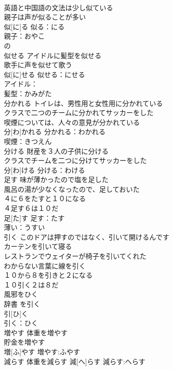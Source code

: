 \documentclass[8pt]{extreport}
\begin{document}
\begin{CJK}{UTF8}{min}
\\	英語と中国語の文法は少し似ている 
\\	親子は声が似ることが多い 
\\	似[に]る			似る：にる
\\	親子：おやこ
\\	の
\\	似せる	アイドルに髪型を似せる 
\\	歌手に声を似せて歌う 
\\	似[に]せる			似せる：にせる
\\	アイドル：
\\	髪型：かみがた
\\	分かれる	トイレは、男性用と女性用に分かれている 
\\	クラスで二つのチームに分かれてサッカーをした 
\\	喫煙については、人々の意見が分かれている 
\\	分[わ]かれる			分かれる：わかれる
\\	喫煙：きつえん
\\	分ける	財産を３人の子供に分ける 
\\	クラスでチームを二つに分けてサッカーをした 
\\	分[わ]ける			分ける：わける
\\	足す	味が薄かったので塩を足した 
\\	風呂の湯が少なくなったので、足しておいた 
\\	４に６をたすと１０になる 
\\	４足す６は１０だ 
\\	足[た]す			足す：たす
\\	薄い：うすい
\\	引く	このドアは押すのではなく、引いて開けるんです 
\\	カーテンを引いて寝る 
\\	レストランでウェイターが椅子を引いてくれた 
\\	わからない言葉に線を引く 
\\	１０から８を引きと２になる 
\\	１０引く２は８だ 
\\	風邪をひく 
\\	辞書 を引く
\\	引[ひ]く		
\\	引く：ひく
\\	増やす	体重を増やす 
\\	貯金を増やす 
\\	増[ふ]やす			増やす:ふやす
\\	減らす	体重を減らす	減[へ]らす			減らす:へらす

\end{CJK}
\end{document}
